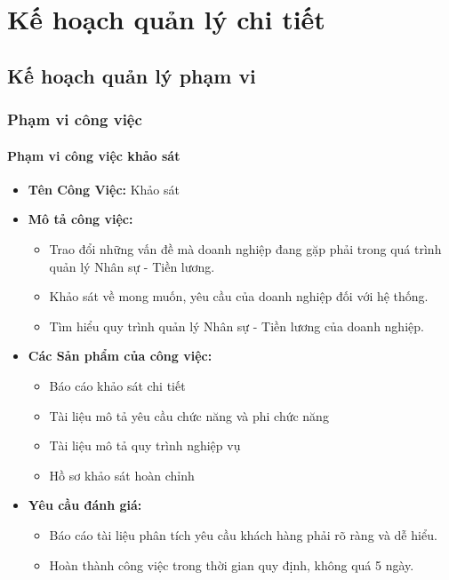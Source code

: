 \chapter{Kế hoạch quản lý chi tiết}
\section{Kế hoạch quản lý phạm vi}
\subsection{Phạm vi công việc}
\subsubsection{Phạm vi công việc khảo sát}
\begin{itemize}
    \item \textbf{Tên Công Việc:} Khảo sát
    \item \textbf{Mô tả công việc:}
          \begin{itemize}
              \item Trao đổi những vấn đề mà doanh nghiệp đang gặp phải trong quá trình quản lý Nhân sự - Tiền lương.
              \item Khảo sát về mong muốn, yêu cầu của doanh nghiệp đối với hệ thống.
              \item Tìm hiểu quy trình quản lý Nhân sự - Tiền lương của doanh nghiệp.
          \end{itemize}
    \item \textbf{Các Sản phẩm của công việc:}
          \begin{itemize}
              \item Báo cáo khảo sát chi tiết
              \item Tài liệu mô tả yêu cầu chức năng và phi chức năng
              \item Tài liệu mô tả quy trình nghiệp vụ
              \item Hồ sơ khảo sát hoàn chỉnh
          \end{itemize}
    \item \textbf{Yêu cầu đánh giá:}
          \begin{itemize}
              \item Báo cáo tài liệu phân tích yêu cầu khách hàng phải rõ ràng và dễ hiểu.
              \item Hoàn thành công việc trong thời gian quy định, không quá 5 ngày.
          \end{itemize}
\end{itemize}
